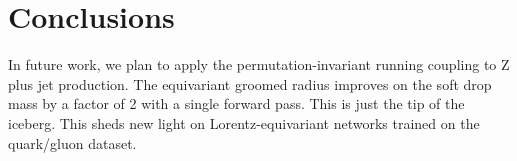 \section{Conclusions}\label{sec:conclusions}

In future work, we plan to apply the permutation-invariant running
coupling to Z plus jet production. The equivariant groomed radius
improves on the soft drop mass by a factor of 2 with a single forward
pass. This is just the tip of the iceberg. This sheds new light on
Lorentz-equivariant networks trained on the quark/gluon dataset.

